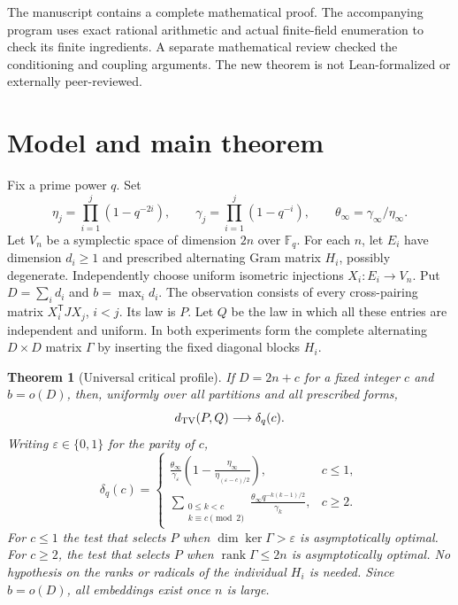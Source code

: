 \documentclass[11pt,letterpaper]{article}
\newtheorem{theorem}{Theorem}[section]
\begin{document}
The manuscript contains a complete mathematical proof. The accompanying
program uses exact rational arithmetic and actual finite-field enumeration
to check its finite ingredients. A separate mathematical review checked
the conditioning and coupling arguments. The new theorem is not
Lean-formalized or externally peer-reviewed.

\section{Model and main theorem}

Fix a prime power $q$. Set
\[
 \eta_j=\prod_{i=1}^j(1-q^{-2i}),\qquad
 \gamma_j=\prod_{i=1}^j(1-q^{-i}),\qquad
 \theta_\infty=\gamma_\infty/\eta_\infty.
\]
Let $V_n$ be a symplectic space of dimension $2n$ over $\mathbb F_q$.
For each $n$, let $E_i$ have dimension $d_i\ge1$ and prescribed alternating
Gram matrix $H_i$, possibly degenerate. Independently choose uniform
isometric injections $X_i:E_i\to V_n$. Put $D=\sum_i d_i$ and
$b=\max_i d_i$. The observation consists of every cross-pairing matrix
$X_i^{\mathsf T}JX_j$, $i<j$. Its law is $P$. Let $Q$ be the law in which
all these entries are independent and uniform. In both experiments form
the complete alternating $D\times D$ matrix $\Gamma$ by inserting the
fixed diagonal blocks $H_i$.

\begin{theorem}[Universal critical profile]\label{thm:main}
If $D=2n+c$ for a fixed integer $c$ and $b=o(D)$, then, uniformly over all
partitions and all prescribed forms,
\[
 d_{\rm TV}(P,Q)\longrightarrow\delta_q(c).
\]
Writing $\varepsilon\in\{0,1\}$ for the parity of $c$,
\[
 \delta_q(c)=
 \begin{cases}
 \displaystyle\frac{\theta_\infty}{\gamma_\varepsilon}
     \left(1-\frac{\eta_\infty}{\eta_{(\varepsilon-c)/2}}\right),
       &c\le1,\\[6pt]
 \displaystyle\sum_{\substack{0\le k<c\\k\equiv c\pmod2}}
       \frac{\theta_\infty q^{-k(k-1)/2}}{\gamma_k},&c\ge2.
 \end{cases}
\]
For $c\le1$ the test that selects $P$ when $\dim\ker\Gamma>\varepsilon$
is asymptotically optimal. For $c\ge2$, the test that selects $P$ when
$\operatorname{rank}\Gamma\le2n$ is asymptotically optimal.
No hypothesis on the ranks or radicals of the individual $H_i$ is needed.
Since $b=o(D)$, all embeddings exist once $n$ is large.
\end{theorem}
\end{document}
